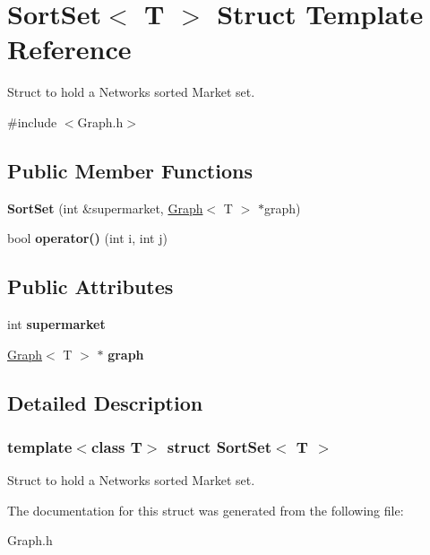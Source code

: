 \hypertarget{struct_sort_set}{}\section{Sort\+Set$<$ T $>$ Struct Template Reference}
\label{struct_sort_set}


Struct to hold a Networks sorted Market set.  




{\ttfamily \#include $<$Graph.\+h$>$}

\subsection*{Public Member Functions}
\begin{DoxyCompactItemize}
\item 
\hypertarget{struct_sort_set_a3b4ee8e3348fce81a52b4837ec6215e3}{}\label{struct_sort_set_a3b4ee8e3348fce81a52b4837ec6215e3} 
{\bfseries Sort\+Set} (int \&supermarket, \hyperlink{class_graph}{Graph}$<$ T $>$ $\ast$graph)
\item 
\hypertarget{struct_sort_set_a601b0e63cd5375a6cccbfe261cdbe124}{}\label{struct_sort_set_a601b0e63cd5375a6cccbfe261cdbe124} 
bool {\bfseries operator()} (int i, int j)
\end{DoxyCompactItemize}
\subsection*{Public Attributes}
\begin{DoxyCompactItemize}
\item 
\hypertarget{struct_sort_set_aad87701b3bc72684584c06fc7b425a45}{}\label{struct_sort_set_aad87701b3bc72684584c06fc7b425a45} 
int {\bfseries supermarket}
\item 
\hypertarget{struct_sort_set_a3f6fdba5fc78e6bbd78fb350f07ddf6a}{}\label{struct_sort_set_a3f6fdba5fc78e6bbd78fb350f07ddf6a} 
\hyperlink{class_graph}{Graph}$<$ T $>$ $\ast$ {\bfseries graph}
\end{DoxyCompactItemize}


\subsection{Detailed Description}
\subsubsection*{template$<$class T$>$\newline
struct Sort\+Set$<$ T $>$}

Struct to hold a Networks sorted Market set. 

The documentation for this struct was generated from the following file\+:\begin{DoxyCompactItemize}
\item 
Graph.\+h\end{DoxyCompactItemize}

